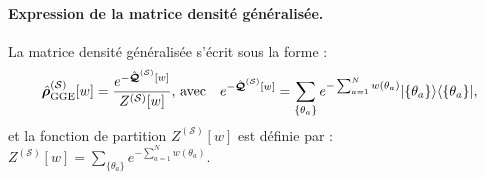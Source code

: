 	

\paragraph{Expression de la matrice densité généralisée.}
La matrice densité généralisée s’écrit sous la forme :
\begin{eqnarray}\label{chap.2.densite.1}
	\hat{\bm{\rho}}^{(\mathcal{S})}_{\mathrm{GGE}}[w]  =  \frac{e^{-\hat{\bm{\mathcal{Q}}}^{(\mathcal{S})}[w]}}{Z^{(\mathcal{S})}[w]}, \, \mbox{avec} \quad e^{-\hat{\bm{\mathcal{Q}}}^{(\mathcal{S})}[w]}  = 	\sum_{\{\theta_a \}} e^{- \sum_{a = 1}^N w(\theta_a) } \vert \{ \theta_a\} \rangle \langle  \{ \theta_a\}  \vert, 
\end{eqnarray}	
et la fonction de partition $Z^{(\mathcal{S})}[w]$ est définie par :
\(
	Z^{(\mathcal{S})}[w]   =  \sum_{\{\theta_a \}} e^{-\sum_{a = 1}^N w(\theta_a)}.		
\)

